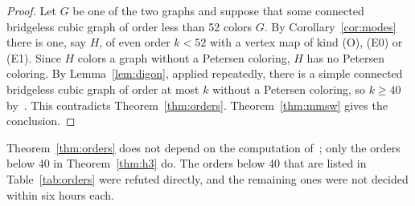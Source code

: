 \documentclass[11pt]{article}
\theoremstyle{definition}
\theoremstyle{remark}
\begin{document}
\begin{proof}
Let $G$ be one of the two graphs and suppose that some connected bridgeless cubic graph of order
less than 52 colors $G$. By Corollary~\ref{cor:modes} there is one, say $H$, of even order
$k < 52$ with a vertex map of kind (O), (E0) or (E1). Since $H$ colors a graph without a Petersen
coloring, $H$ has no Petersen coloring. By Lemma~\ref{lem:digon}, applied repeatedly, there is a
simple connected bridgeless cubic graph of order at most $k$ without a Petersen coloring, so
$k \ge 40$ by~\cite[Observation~9]{GJMMMU2026}. This contradicts Theorem~\ref{thm:orders}.
Theorem~\ref{thm:mmsw} gives the conclusion.
\end{proof}

Theorem~\ref{thm:orders} does not depend on the computation of~\cite{GJMMMU2026}; only the orders
below 40 in Theorem~\ref{thm:h3} do. The orders below 40 that are listed in
Table~\ref{tab:orders} were refuted directly, and the remaining ones were not decided within six
hours each.
\end{document}
